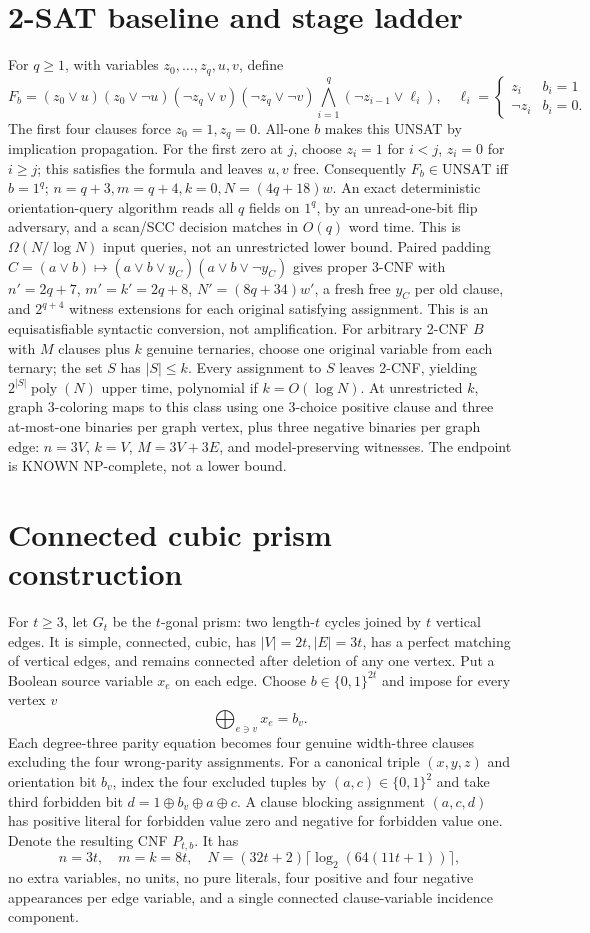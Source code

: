 \documentclass[11pt]{article}
\begin{document}
\section{2-SAT baseline and stage ladder}
For $q\ge1$, with variables $z_0,\ldots,z_q,u,v$, define
\[
F_b=(z_0\vee u)(z_0\vee\neg u)(\neg z_q\vee v)(\neg z_q\vee\neg v)\bigwedge_{i=1}^q(\neg z_{i-1}\vee \ell_i),
\quad\ell_i=\begin{cases}z_i&b_i=1\\\neg z_i&b_i=0.\end{cases}
\]
The first four clauses force $z_0=1,z_q=0$. All-one $b$ makes this UNSAT by implication propagation. For the first zero at $j$, choose $z_i=1$ for $i<j$, $z_i=0$ for $i\ge j$; this satisfies the formula and leaves $u,v$ free. Consequently $F_b\in\mathrm{UNSAT}$ iff $b=1^q$; $n=q+3,m=q+4,k=0,N=(4q+18)w$. An exact deterministic orientation-query algorithm reads all $q$ fields on $1^q$, by an unread-one-bit flip adversary, and a scan/SCC decision matches in $O(q)$ word time. This is $\Omega(N/\log N)$ input queries, not an unrestricted lower bound.
Paired padding $C=(a\vee b)\mapsto (a\vee b\vee y_C)(a\vee b\vee\neg y_C)$ gives proper 3-CNF with $n'=2q+7$, $m'=k'=2q+8$, $N'=(8q+34)w'$, a fresh free $y_C$ per old clause, and $2^{q+4}$ witness extensions for each original satisfying assignment. This is an equisatisfiable syntactic conversion, not amplification.
For arbitrary 2-CNF $B$ with $M$ clauses plus $k$ genuine ternaries, choose one original variable from each ternary; the set $S$ has $|S|\le k$. Every assignment to $S$ leaves 2-CNF, yielding $2^{|S|}\operatorname{poly}(N)$ upper time, polynomial if $k=O(\log N)$. At unrestricted $k$, graph 3-coloring maps to this class using one 3-choice positive clause and three at-most-one binaries per graph vertex, plus three negative binaries per graph edge: $n=3V$, $k=V$, $M=3V+3E$, and model-preserving witnesses. The endpoint is KNOWN NP-complete, not a lower bound.

\section{Connected cubic prism construction}
For $t\ge3$, let $G_t$ be the $t$-gonal prism: two length-$t$ cycles joined by $t$ vertical edges. It is simple, connected, cubic, has $|V|=2t,|E|=3t$, has a perfect matching of vertical edges, and remains connected after deletion of any one vertex. Put a Boolean source variable $x_e$ on each edge. Choose $b\in\{0,1\}^{2t}$ and impose for every vertex $v$
\[
\bigoplus_{e\ni v} x_e=b_v.
\]
Each degree-three parity equation becomes four genuine width-three clauses excluding the four wrong-parity assignments. For a canonical triple $(x,y,z)$ and orientation bit $b_v$, index the four excluded tuples by $(a,c)\in\{0,1\}^2$ and take third forbidden bit $d=1\oplus b_v\oplus a\oplus c$. A clause blocking assignment $(a,c,d)$ has positive literal for forbidden value zero and negative for forbidden value one. Denote the resulting CNF $P_{t,b}$. It has
\[
n=3t,\quad m=k=8t,\quad N=(32t+2)\lceil\log_2(64(11t+1))\rceil,
\]
no extra variables, no units, no pure literals, four positive and four negative appearances per edge variable, and a single connected clause-variable incidence component.
\end{document}
